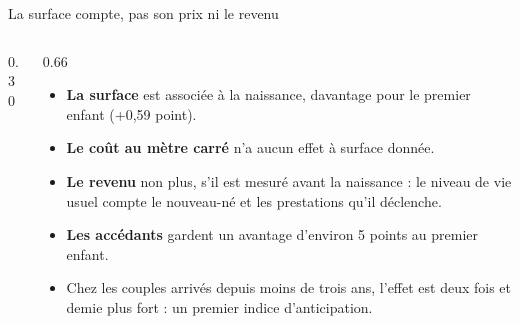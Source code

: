 \documentclass[10pt,aspectratio=169]{beamer}
\begin{document}
\begin{frame}{La surface compte, pas son prix ni le revenu}
  \begin{columns}[T]
    \begin{column}{0.30\textwidth}
      \vspace{0.2cm}
    \end{column}
    \begin{column}{0.66\textwidth}
      \begin{itemize}\setlength{\itemsep}{0.45em}
        \item \textbf{La surface} est associée à la naissance, davantage pour le premier enfant (+0,59 point).
        \item \textbf{Le coût au mètre carré} n'a aucun effet à surface donnée.
        \item \textbf{Le revenu} non plus, s'il est mesuré avant la naissance : le niveau de vie usuel compte le nouveau-né et les prestations qu'il déclenche.
        \item \textbf{Les accédants} gardent un avantage d'environ 5 points au premier enfant.
        \item Chez les couples arrivés depuis moins de trois ans, l'effet est deux fois et demie plus fort : un premier indice d'anticipation.
      \end{itemize}
    \end{column}
  \end{columns}
\end{frame}
\end{document}
